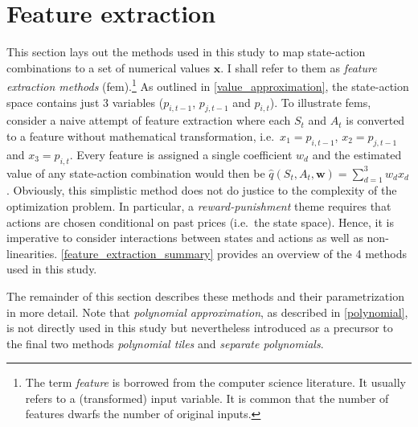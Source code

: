 \section{Feature extraction}\label{feature_extraction}

This section lays out the methods used in this study to map state-action combinations to a set of numerical values $\boldsymbol{x}$. I shall refer to them as \emph{feature extraction methods} (\gls{fem}).\footnote{The term \emph{feature} is borrowed from the computer science literature. It usually refers to a (transformed) input variable. It is common that the number of features dwarfs the number of original inputs.} As outlined in \autoref{value_approximation}, the state-action space contains just 3 variables ($p_{i,t-1}$, $p_{j,t-1}$ and $p_{i,t}$). To illustrate \gls{fem}s, consider a naive attempt of feature extraction where each $S_t$ and $A_t$ is converted to a feature without mathematical transformation, i.e.\ $x_1 = p_{i,t-1}$, $x_2 = p_{j,t-1}$ and $x_3 = p_{i,t}$. Every feature is assigned a single coefficient $w_d$ and the estimated value of any state-action combination would then be $\hat{q}(S_t, A_t, \boldsymbol{w}) = \sum_{d=1}^3 w_d x_d$. Obviously, this simplistic method does not do justice to the complexity of the optimization problem. In particular, a \emph{reward-punishment} theme requires that actions are chosen conditional on past prices (i.e.\ the state space). Hence, it is imperative to consider interactions between states and actions as well as non-linearities. \autoref{feature_extraction_summary} provides an overview of the 4 methods used in this study.

The remainder of this section describes these methods and their parametrization in more detail. Note that \emph{polynomial approximation}, as described in \autoref{polynomial}, is not directly used in this study but nevertheless introduced as a precursor to the final two methods \emph{polynomial tiles} and \emph{separate polynomials}.

